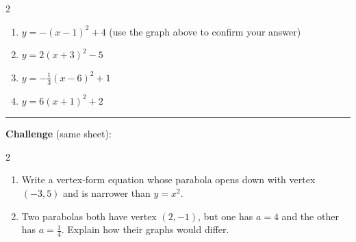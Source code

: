 \documentclass[12pt]{article}
\begin{document}
\begin{multicols}{2}
\begin{enumerate}[label=\textbf{\arabic*.}, start=10, itemsep=3cm]
  \item $y=-(x-1)^2+4$ (use the graph above to confirm your answer)
  \item $\displaystyle y=2(x+3)^2-5$
  \item $\displaystyle y=-\frac{1}{3}(x-6)^2+1$
  \item $\displaystyle y=6(x+1)^2+2$
\end{enumerate}
\end{multicols}

\vspace{0.2cm}\hrule\vspace{0.3cm}
\textbf{Challenge} (same sheet):\\[4pt]
\begin{multicols}{2}
\begin{enumerate}[label=\textbf{\arabic*.}, start=14, itemsep=2.2cm]
  \item Write a vertex-form equation whose parabola opens down with vertex $(-3,5)$ and is narrower than $y=x^2$.
  \item Two parabolas both have vertex $(2,-1)$, but one has $a=4$ and the other has $a=\frac{1}{4}$. Explain how their graphs would differ.
\end{enumerate}
\end{multicols}

\newpage
\end{document}

